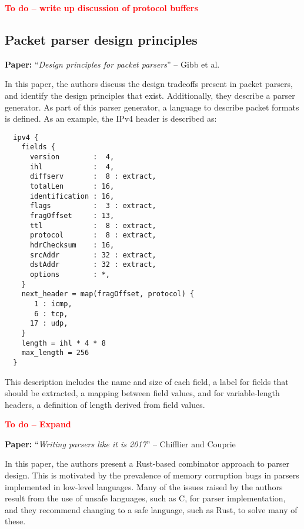 \documentclass[10pt,a4paper]{article}
\newcommand{\todo}[1]{\textbf{\textcolor{red}{To do -- #1}}}
\newcommand{\paper}[3]{\vspace{4mm}\noindent\textbf{Paper:} ``\textit{#1}'' -- #2 \cite{#3}\vspace{3mm}}
\begin{document}
\todo{write up discussion of protocol buffers}

\subsection{Packet parser design principles}

\paper{Design principles for packet parsers}{Gibb et al.}{gibb2013design}

In this paper, the authors discuss the design tradeoffs present in packet parsers, and
identify the design principles that exist. Additionally, they describe a parser generator.
As part of this parser generator, a language to describe packet formats is defined.
As an example, the IPv4 header is described as:

\begin{verbatim}
  ipv4 {
    fields {
      version        :  4,
      ihl            :  4,
      diffserv       :  8 : extract,
      totalLen       : 16,
      identification : 16,
      flags          :  3 : extract,
      fragOffset     : 13,
      ttl            :  8 : extract,
      protocol       :  8 : extract,
      hdrChecksum    : 16,
      srcAddr        : 32 : extract,
      dstAddr        : 32 : extract,
      options        : *,
    }
    next_header = map(fragOffset, protocol) {
       1 : icmp,
       6 : tcp,
      17 : udp,
    }
    length = ihl * 4 * 8
    max_length = 256
  }
\end{verbatim}

This description includes the name and size of each field, a label for fields that should
be extracted, a mapping between field values, and for variable-length headers, a
definition of length derived from field values.

\todo{Expand}

\paper{Writing parsers like it is 2017}{Chifflier and Couprie}{chifflier2017writing}

In this paper, the authors present a Rust-based combinator approach to parser design. This
is motivated by the prevalence of memory corruption bugs in parsers implemented in
low-level languages. Many of the issues raised by the authors result from the use of
unsafe languages, such as C, for parser implementation, and they recommend changing to a 
safe language, such as Rust, to solve many of these.
\end{document}
